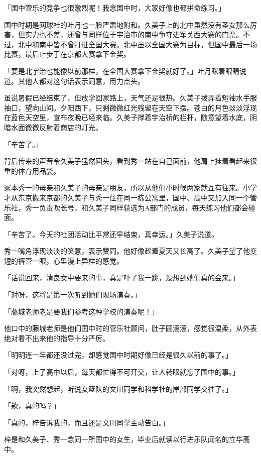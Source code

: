 \documentclass[UTF8]{ctexart}
\begin{document}
    「国中管乐的竞争也很激烈呢！我念国中时，大家好像也都拼命练习。」 

    国中时期是网球社的叶月也一脸严肃地附和。久美子上的北中虽然没有圣女那么厉害，但实力也不差，还曾与同样位于宇治市的南中争夺进军关西大赛的门票。不过，北中和南中皆不曾打进全国大赛。北中虽以全国大赛为目标，但国中最后一场比赛，最后止步于在京都大赛拿下金奖。 

    「要是北宇治也能像以前那样，在全国大赛拿下金奖就好了。」叶月眯着眼睛说道。其他人都对这句话表示同意，用力点头。 

    虽说暑假已经结束了，但放学回家路上，天气还是很热。久美子拨弄着短袖水手服袖口，望向山间。夕阳西下，只剩微微红光残留在天空下摆。苍白的月色淡淡浮现在蓝色天空里，宣布夜晚已经来临。久美子撑着宇治桥的栏杆，随意望着水底，阴暗水面微微反射着商店的灯光。 

    「辛苦了。」 

    背后传来的声音令久美子猛然回头，看到秀一站在自己面前，他肩上挂着看起来很重的体育用品袋。 

    冢本秀一的母亲和久美子的母亲是朋友，所以从他们小时候两家就互有往来。小学才从东京搬来京都的久美子与秀一住在同一栋公寓里，国中、高中又加入同一个管乐社，秀一负责吹长号，和久美子同样获选为A部门的成员，每天练习他们都会碰面。 

    「辛苦了。今天的社团活动比平常还早结束，真幸运。」久美子说道。 

    秀一嘴角浮现淡淡的笑意，表示赞同。他好像趁着夏天又长高了。久美子望了他变短的裤管一眼，心里漫上异样的感觉。 

    「话说回来，清良女中要来的事，真是吓了我一跳，没想到她们真的会来。」 

    「对呀，这将是第一次听到她们现场演奏。」 

    「藤城老师老是要我们参考这种学校的演奏呢！」 

    他口中的藤城老师是他们国中时的管乐社顾问，肚子圆滚滚，感觉很温柔，从外表绝对看不出来他的指导十分严厉。 

    「明明连一年都还没过完，却感觉国中时期好像已经是很久以前的事了。」 

    「对呀，上了高中以后，每天都忙得不可开交，让人转眼就忘了国中的事。」 

    「啊，我突然想起，听说女篮队的文川同学和科学社的岸部同学交往了。」 

    「欸，真的吗？」 

    「真的，梓告诉我的，而且还是文川同学主动告白。」 

    梓是和久美子、秀一念同一所国中的女生，毕业后就读以行进乐队闻名的立华高中。 
\end{document}
